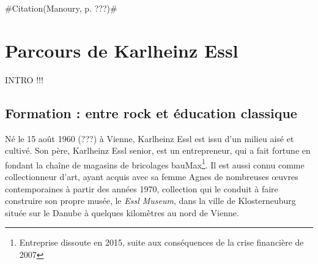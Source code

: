 \documentclass[a4paper,12pt]{article}
\newcommand{\guill}[1]{«~#1~»}
\newcommand{\zitat}[2]{\#Citation(#2)\#}
\begin{document}
\zitat{Les débuts de cette \emph{computer music} nous emmènent donc bien loin d'une expérience du temps réel\dots
Manoury : C'était, en effet, un retour au temps différé. À l'époque où les synthétiseurs commençaient à être utilisés pour les tâches très précises, l'intérêt de l'informatique est rapidement devenu manifeste. Cependant, ce n'est qu'au début des années quatre-vingt qu'ont été conçus les premiers ordinateurs suffisamment rapides pour effectuer les calculs en temps réel --- disons suffisamment rapidement pour que l'oreille ne perçoive pas le temps de calcul. Le prototype le plus connu est la 4X. C'était la première fois que l'on pouvait atteindre un \guill{temps réel} numérique, c'est-à-dire inscriptible sur une matière, et cela ouvrait immédiatement la possibilité d'interagir directement avec le jeu instrumental, de se synchroniser avec lui, d'effectuer les calculs au moment même du concert, avec le son du concert et non plus à partir d'une source figée.}
{Manoury, p. ???}


\section{Parcours de Karlheinz Essl}

INTRO !!!

\subsection{Formation : entre rock et éducation classique}

Né le 15 août 1960 (???) à Vienne, Karlheinz Essl est issu d'un milieu aisé et cultivé. Son père, Karlheinz Essl senior, est un entrepreneur, qui a fait fortune en fondant la chaîne de magasins de bricolages bauMax\footnote{Entreprise dissoute en 2015, suite aux conséquences de la crise financière de 2007}. Il est aussi connu comme collectionneur d'art, ayant acquis avec sa femme Agnes de nombreuses œuvres contemporaines à partir des années 1970, collection qui le conduit à faire construire son propre musée, le \emph{Essl Museum}, dans la ville de Klosterneuburg située sur le Danube à quelques kilomètres au nord de Vienne.
\end{document}
